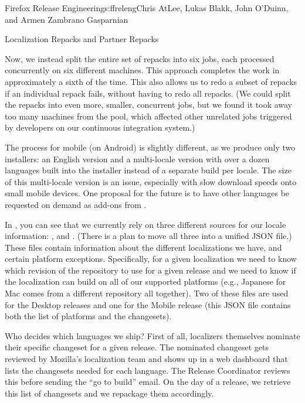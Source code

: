 \begin{aosachapter}{Firefox Release Engineering}{s:ffreleng}{Chris AtLee, Lukas Blakk, John O'Duinn, and Armen Zambrano Gasparnian}
\begin{aosasect1}{Localization Repacks and Partner Repacks}

Now, we instead split the entire set of repacks into
six jobs, each processed concurrently on six
different machines. This approach completes the work in
approximately a sixth of the time. This also allows us to redo
a subset of repacks if an individual repack fails, without
having to redo all repacks. (We could split the repacks into
even more, smaller, concurrent jobs, but we found it took away
too many machines from the pool, which affected other unrelated
jobs triggered by developers on our continuous integration
system.) 
    
The process for mobile (on Android) is slightly different, as we produce
only two installers:  an English version and a multi-locale version 
with over a dozen languages built into the installer
instead of a separate build per locale. The size of this
multi-locale version is an issue, especially with slow
download speeds onto small mobile devices. One proposal for
the future is to have other languages be requested on demand
as add-ons from .

In , you can see that we currently rely
on three different sources for our locale information:
,  and
. (There is a plan to move
all three into a unified JSON file.) These files contain information
about the different localizations we have, and certain platform
exceptions. Specifically, for a given localization we need to know
which revision of the repository to use for a given release and we
need to know if the localization can build on all of our supported
platforms (e.g.,  Japanese for Mac comes from a different repository all
together).  Two of these files are used for the Desktop releases and
one for the Mobile release (this JSON file contains both the list of
platforms and the changesets).

Who decides which languages we ship? First of all, localizers
themselves nominate their specific changeset for a given release. The
nominated changeset gets reviewed by Mozilla's localization team and
shows up in a web dashboard that lists the changesets needed for each
language. The Release Coordinator reviews this before sending the ``go
to build'' email. On the day of a release, we retrieve this list of
changesets and we repackage them accordingly.


\end{aosasect1}
\end{aosachapter}
